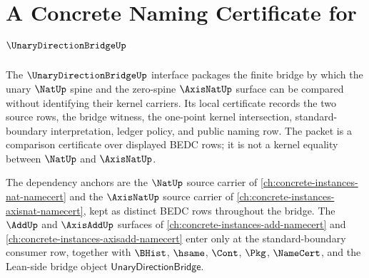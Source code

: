 \chapter{A Concrete Naming Certificate for $\UnaryDirectionBridgeUp$}
\label{ch:concrete-instances-unarydirectionbridge-namecert}

The $\UnaryDirectionBridgeUp$ interface packages the finite bridge by which the unary $\NatUp$ spine and the zero-spine $\AxisNatUp$ surface can be compared without identifying their kernel carriers. Its local certificate records the two source rows, the bridge witness, the one-point kernel intersection, standard-boundary interpretation, ledger policy, and public naming row. The packet is a comparison certificate over displayed BEDC rows; it is not a kernel equality between $\NatUp$ and $\AxisNatUp$.

The dependency anchors are the $\NatUp$ source carrier of \autoref{ch:concrete-instances-nat-namecert} and the $\AxisNatUp$ source carrier of \autoref{ch:concrete-instances-axisnat-namecert}, kept as distinct BEDC rows throughout the bridge. The $\AddUp$ and $\AxisAddUp$ surfaces of \autoref{ch:concrete-instances-add-namecert} and \autoref{ch:concrete-instances-axisadd-namecert} enter only at the standard-boundary consumer row, together with $\BHist$, $\hsame$, $\Cont$, $\Pkg$, $\NameCert$, and the Lean-side bridge object $\mathsf{UnaryDirectionBridge}$.

